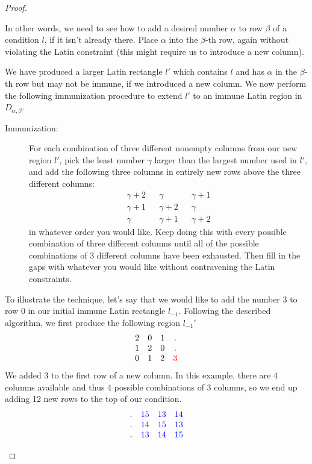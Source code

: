 \documentclass[12pt,a4paper]{article}
\begin{document}
\begin{proof}
\begin{enumerate}
	In other words, we need to see how to add a desired number $\alpha$ to row $\beta$ of a condition $l$, if it isn't already there. Place $\alpha$ into the $\beta$-th row, again without violating the Latin constraint (this might require us to introduce a new column).
	
	We have produced a larger Latin rectangle $l'$ which contains $l$ and has $\alpha$ in the $\beta$-th row but may not be immune, if we introduced a new column. We now perform the following immunization procedure to extend $l'$ to an immune Latin region in $D_{\alpha,\beta}$.
\begin{description}
		\item[Immunization:] For each combination of three different nonempty columns from our new region $l'$, pick the least number $\gamma$ larger than the largest number used in $l'$, and add the following three columns in entirely new rows above the three different columns: 
				$$\begin{array}{ccccc}
			\gamma+2  && \gamma   &&  \gamma+1 \\ 
			\gamma+1  && \gamma+2 &&  \gamma \\
			\gamma  && \gamma+1 && \gamma+2
		\end{array}$$ in whatever order you would like. Keep doing this with every possible combination of three different columns until all of the possible combinations of 3 different columns have been exhausted. Then fill in the gaps with whatever you would like without contravening the Latin constraints. 
		\end{description}
		To illustrate the technique, let's say that we would like to add the number $3$ to row $0$ in our initial immune Latin rectangle $l_{-1}$. Following the described algorithm, we first produce
		the following region $l_{-1}'$ 
		$$\begin{array}{cccc}
			2  & 0   &  1 & .  \\ 
			1 & 2 &  0  & . \\
			 0  & 1 & 2 & \color{red} 3
		\end{array}$$
		We added 3 to the first row of a new column. In this example, there are 4 columns available and thus 4 possible combinations of 3 columns, so we end up adding 12 new rows to the top of our condition.		
		$$\begin{array}{cccc}
						. &\color{blue}15& \color{blue}13&\color{blue}14\\
						. &\color{blue}14&\color{blue}15&\color{blue}13\\
						. &\color{blue}13&\color{blue}14&\color{blue}15\\

\end{array}$$
\end{enumerate}
\end{proof}
\end{document}
